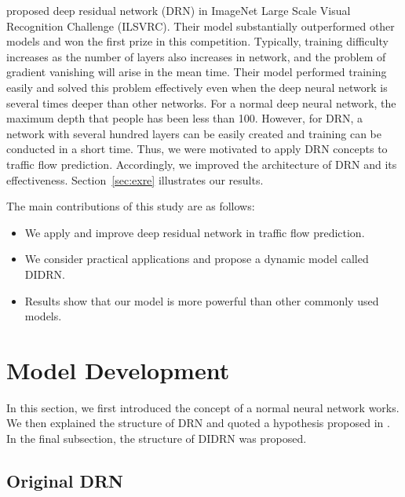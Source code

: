 \documentclass[twocolumn]{article}
\begin{document}
\par
\citet{DRN} proposed deep residual network (DRN) in ImageNet Large Scale Visual Recognition Challenge (ILSVRC). Their model substantially outperformed other models and won the first prize in this competition. Typically, training difficulty increases as the number of layers also increases in network, and the problem of gradient vanishing will arise in the mean time.  Their model performed training easily and solved this problem effectively even when the deep neural network is several times deeper than other networks.  For a normal deep neural network, the maximum depth that people has been less than 100. However, for DRN, a network with several hundred layers can be easily created and training can be conducted in a short time. Thus, we were motivated to apply DRN concepts to traffic flow prediction. Accordingly, we improved the architecture of DRN and its effectiveness. Section~\ref{sec:exre} illustrates our results.

\par
The main contributions of this study are as follows:
\begin{itemize}
    \item We apply and improve deep residual network in traffic flow prediction.
    \item We consider practical applications and propose a dynamic model called DIDRN.
    \item Results show that our model is more powerful than other commonly used models.
\end{itemize}

\section{Model Development} \label{sec:method}
In this section, we first introduced the concept of a normal neural network works. We then explained the structure of DRN and quoted a hypothesis proposed in \citep{DRN}. In the final subsection, the structure of DIDRN was proposed.

\subsection{Original DRN}\label{sec:DRN}
\end{document}

